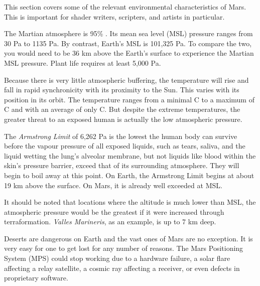 

This section covers some of the relevant environmental characteristics of Mars. This is important for shader writers, scripters, and artists in particular.

The Martian atmosphere is 95\% . Its mean sea level (MSL) pressure ranges from 30 Pa to 1135 Pa. By contrast, Earth's MSL is 101,325 Pa. To compare the two, you would need to be 36 km above the Earth's surface to experience the Martian MSL pressure. Plant life requires at least 5,000 Pa.

Because there is very little atmospheric buffering, the temperature will rise and fall in rapid synchronicity with its proximity to the Sun. This varies with its position in its orbit. The temperature ranges from a minimal C to a maximum of C and with an average of only C. But despite the extreme temperatures, the greater threat to an exposed human is actually the low atmospheric pressure.

The {\it Armstrong Limit} of 6,262 Pa is the lowest the human body can survive before the vapour pressure of all exposed liquids, such as tears, saliva, and the liquid wetting the lung's alveolar membrane, but not liquids like blood within the skin's pressure barrier, exceed that of its surrounding atmosphere. They will begin to boil away at this point. On Earth, the Armstrong Limit begins at about 19 km above the surface. On Mars, it is already well exceeded at MSL.

It should be noted that locations where the altitude is much lower than MSL, the atmospheric pressure would be the greatest if it were increased through terraformation. {\it Valles Marineris}, as an example, is up to 7 km deep.

Deserts are dangerous on Earth and the vast ones of Mars are no exception. It is very easy for one to get lost for any number of reasons. The Mars Positioning System (MPS) could stop working due to a hardware failure, a solar flare affecting a relay satellite, a cosmic ray affecting a receiver, or even defects in proprietary software.

